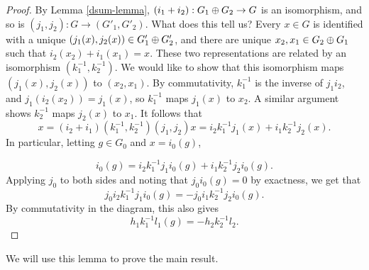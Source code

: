 \begin{proof}
By Lemma \ref{dsum-lemma}, $(i_1+i_2):G_1\oplus G_2\rightarrow G$ is an isomorphism, and so is $(j_1,j_2):G\rightarrow(G'_1,G'_2)$. What does this tell us? Every $x\in G$ is identified with a unique $(j_1(x),j_2(x))\in G_1'\oplus G_2'$, and there are unique $x_2,x_1\in G_2\oplus G_1$ such that $i_2(x_2)+i_1(x_1)=x$. These two representations are related by an isomorphism $(k_1^{-1},k_2^{-1})$. We would like to show that this isomorphism maps $(j_1(x),j_2(x))$ to $(x_2,x_1)$. By commutativity, $k_1^{-1}$ is the inverse of $j_1i_2$, and $j_1(i_2(x_2))=j_1(x)$, so $k_1^{-1}$ maps $j_1(x)$ to $x_2$. A similar argument shows $k_2^{-1}$ maps $j_2(x)$ to $x_1$. It follows that $$x=(i_2+i_1)(k_1^{-1},k_2^{-1})(j_1,j_2)x=i_2k_1^{-1}j_1(x)+i_1k_2^{-1}j_2(x).$$ In particular, letting $g\in G_0$ and $x=i_0(g)$, 

$$i_0(g)=i_2k_1^{-1}j_1i_0(g)+i_1k_2^{-1}j_2i_0(g).$$
Applying $j_0$ to both sides and noting that $j_0i_0(g)=0$ by exactness, we get that 
$$j_0i_2k_1^{-1}j_1i_0(g)=-j_0i_1k_2^{-1}j_2i_0(g).$$
By commutativity in the diagram, this also gives
$$h_1k_1^{-1}l_1(g)=-h_2k_2^{-1}l_2.$$
\cite{Eilenberg}
\end{proof}

We will use this lemma to prove the main result.

